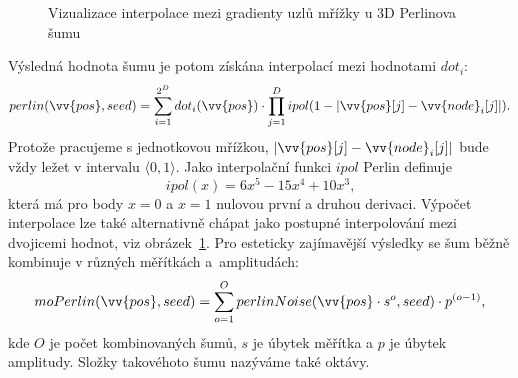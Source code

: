 \begin{figure}[H]
\begin{minipage}[t]{0.48\textwidth}
		\caption{Vizualizace interpolace mezi gradienty uzlů mřížky u 3D Perlinova šumu}
		\label{perlinInterpolation}
	\end{minipage}	
\end{figure}\vspace{5mm}


Výsledná hodnota šumu je potom získána interpolací mezi hodnotami $dot_i$:
\begin{equation}
	perlin(\vv{pos}, seed) = \sum_{i=1}^{2^D} dot_i(\vv{pos}) \cdot \prod_{j=1}^{D} ipol(1 - |\vv{pos}[j] - \vv{node}_i[j]|) \text{.}
\end{equation}
Protože pracujeme s jednotkovou mřížkou, $|\vv{pos}[j] - \vv{node}_i[j]|$ bude vždy ležet v intervalu $\langle 0, 1 \rangle$. Jako interpolační funkci $ipol$ Perlin \cite{PerlinKen2002In} definuje
\begin{equation}
	ipol(x) = 6x^5 - 15x^4 + 10x^3 \text{,}
\end{equation}
která má pro body $x = 0$ a $x = 1$ nulovou první a druhou derivaci. Výpočet interpolace lze také alternativně chápat jako postupné interpolování mezi dvojicemi hodnot, viz obrázek~\ref{perlinInterpolation}. Pro esteticky zajímavější výsledky se šum běžně kombinuje v různých měřítkách a~amplitudách:
\begin{equation}
	moPerlin(\vv{pos}, seed) = \sum_{o = 1}^{O} perlinNoise(\vv{pos} \cdot s^o, seed) \cdot p^{(o-1)} \text{,}
\end{equation}
kde $O$ je počet kombinovaných šumů, $s$ je úbytek měřítka a $p$ je úbytek amplitudy. Složky takovéhoto šumu nazýváme také oktávy.

